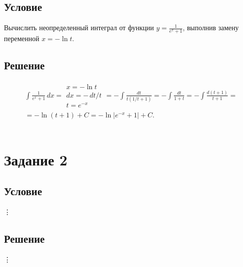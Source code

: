 \documentclass[12pt]{article}
\begin{document}
    \subsection*{Условие}
        Вычислить неопределенный интеграл от функции $y=\frac{1}{e^{x}+1}$, выполнив замену переменной $x=-\ln{t}$.
    
    \subsection*{Решение}
        \begin{displaymath}
            \begin{split}
                &\int{\frac{1}{e^{x}+1}\,dx}=
                    \begin{array}{|l|}
                     x=-\ln{t}\\
                     dx=-\,dt/t\\
                     t=e^{-x} 
                    \end{array}=
                -\int{\frac{dt}{t(1/t+1)}}=
                -\int{\frac{dt}{1+t}}=
                -\int{\frac{d(t+1)}{t+1}}=\\
                &=-\ln{(t+1)}+C=
                -\ln{|e^{-x}+1|}+C.
            \end{split}
        \end{displaymath}\\


\section*{Задание 2}
    \subsection*{Условие}
        \vdots
    
    \subsection*{Решение}
        \vdots
        
\end{document}
